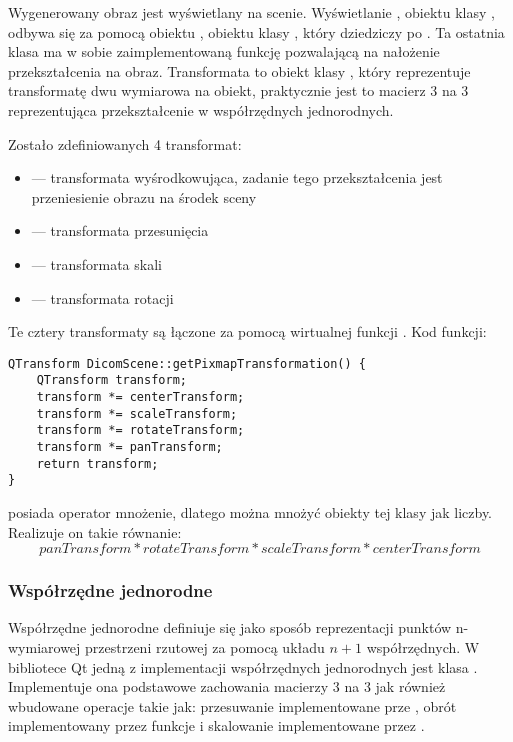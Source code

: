 \label{sec:algorithm-pixmap-transformat}

\par
Wygenerowany obraz jest wyświetlany na scenie.
Wyświetlanie , obiektu klasy , odbywa się za pomocą obiektu , obiektu klasy , który dziedziczy po .
Ta ostatnia klasa ma w sobie zaimplementowaną funkcję pozwalającą na nałożenie przekształcenia na obraz.
Transformata to obiekt klasy , który reprezentuje transformatę dwu wymiarowa na obiekt, praktycznie jest to macierz 3 na 3 reprezentująca przekształcenie w współrzędnych jednorodnych.
\par

Zostało zdefiniowanych 4 transformat:
\begin{itemize}
    \item {} --- transformata wyśrodkowująca, zadanie tego przekształcenia jest przeniesienie obrazu na środek sceny
    \item {} --- transformata przesunięcia
    \item {} --- transformata skali
    \item {} --- transformata rotacji
\end{itemize}

Te cztery transformaty są łączone za pomocą wirtualnej funkcji .
Kod funkcji:
\begin{lstlisting}
QTransform DicomScene::getPixmapTransformation() {
	QTransform transform;
	transform *= centerTransform;
	transform *= scaleTransform;
	transform *= rotateTransform;
	transform *= panTransform;
	return transform;
}
\end{lstlisting}
 posiada operator mnożenie, dlatego można mnożyć obiekty tej klasy jak liczby.
Realizuje on takie równanie:
\[panTransform*rotateTransform*scaleTransform*centerTransform\]

\subsubsection{Współrzędne jednorodne}

Współrzędne jednorodne definiuje się jako sposób reprezentacji punktów n-wymiarowej przestrzeni rzutowej za pomocą układu $n+1$ współrzędnych.
W bibliotece Qt jedną z implementacji współrzędnych jednorodnych jest klasa .
Implementuje ona podstawowe zachowania macierzy 3 na 3 jak również wbudowane operacje takie jak: przesuwanie implementowane prze , obrót implementowany przez funkcje  i skalowanie implementowane przez .

